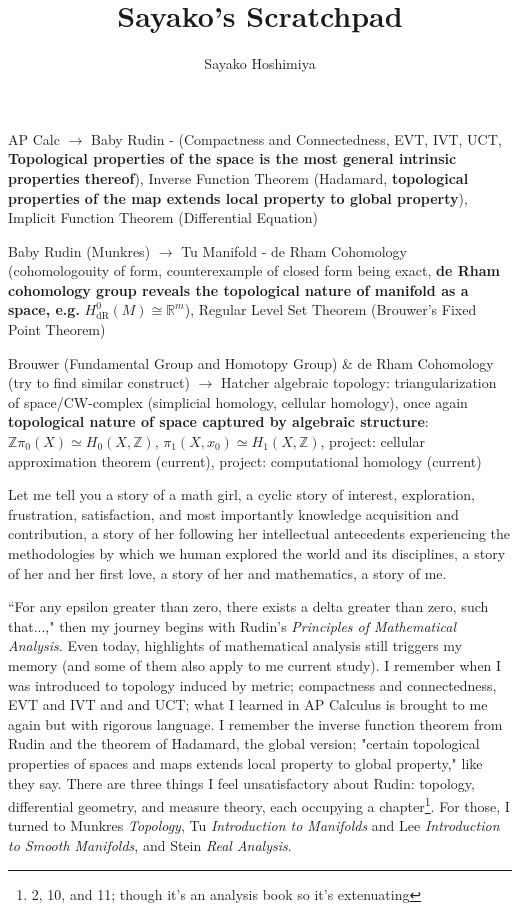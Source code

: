 \documentclass[10pt]{article}
\title{Sayako's Scratchpad}
\author{Sayako Hoshimiya}
\begin{document}
\begin{CJK*}{UTF8}{gbsn}
\maketitle
\renewcommand{\setminus}{\mathbin{\backslash}}
\def \setminus {\mathbin{\backslash}}
AP Calc $\to$ Baby Rudin - (Compactness and Connectedness, EVT, IVT, UCT, \textbf{Topological properties of the space is the most general intrinsic properties thereof}), Inverse Function Theorem (Hadamard, \textbf{topological properties of the map extends local property to global property}), Implicit Function Theorem (Differential Equation)

Baby Rudin (Munkres) $\to$ Tu Manifold - de Rham Cohomology (cohomologouity of form, counterexample of closed form being exact, \textbf{de Rham cohomology group reveals the topological nature of manifold as a space, e.g.} $H_{\mathrm{dR}}^{0}(M) \cong \mathbb{R}^{m}$), Regular Level Set Theorem (Brouwer's Fixed Point Theorem)

Brouwer (Fundamental Group and Homotopy Group) \& de Rham Cohomology (try to find similar construct) $\to$ Hatcher algebraic topology: triangularization of space/CW-complex (simplicial homology, cellular homology), once again \textbf{topological nature of space captured by algebraic structure}: $\mathbb{Z} \pi_{0}(X) \simeq H_{0}(X, \mathbb{Z})$, $\pi_1(X,x_0)\simeq H_1(X,\mathbb{Z})$, project: cellular approximation theorem (current), project: computational homology (current)

\noindent\makebox[\linewidth]{\rule{\paperwidth}{0.4pt}}

Let me tell you a story of a math girl, a cyclic story of interest, exploration, frustration, satisfaction, and most importantly knowledge acquisition and contribution, a story of her following her intellectual antecedents experiencing the methodologies by which we human explored the world and its disciplines, a story of her and her first love, a story of her and mathematics, a story of me.

``For any epsilon greater than zero, there exists a delta greater than zero, such that...," then my journey begins with Rudin's \textit{Principles of Mathematical Analysis}. Even today, highlights of mathematical analysis still triggers my memory (and some of them also apply to me current study). I remember when I was introduced to topology induced by metric; compactness and connectedness, EVT and IVT and and UCT; what I learned in AP Calculus is brought to me again but with rigorous language. I remember the inverse function theorem from Rudin and the theorem of Hadamard, the global version; "certain topological properties of spaces and maps extends local property to global property," like they say. There are three things I feel unsatisfactory about Rudin: topology, differential geometry, and measure theory, each occupying a chapter\footnote{2, 10, and 11; though it's an analysis book so it's extenuating}. For those, I turned to Munkres \textit{Topology}, Tu \textit{Introduction to Manifolds} and Lee \textit{Introduction to Smooth Manifolds}, and Stein \textit{Real Analysis}. 


\end{CJK*}
\end{document}
